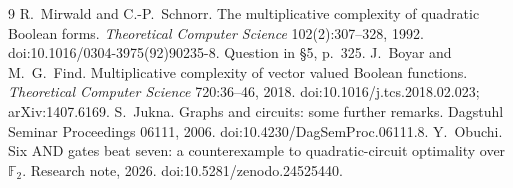 \begin{thebibliography}{9}
 R.~Mirwald and C.-P.~Schnorr. The multiplicative complexity of quadratic Boolean forms. \emph{Theoretical Computer Science} 102(2):307--328, 1992. doi:10.1016/0304-3975(92)90235-8. Question in \S5, p.~325.
 J.~Boyar and M.~G.~Find. Multiplicative complexity of vector valued Boolean functions. \emph{Theoretical Computer Science} 720:36--46, 2018. doi:10.1016/j.tcs.2018.02.023; arXiv:1407.6169.
 S.~Jukna. Graphs and circuits: some further remarks. Dagstuhl Seminar Proceedings 06111, 2006. doi:10.4230/DagSemProc.06111.8.
 Y.~Obuchi. Six AND gates beat seven: a counterexample to quadratic-circuit optimality over $\mathbb F_2$. Research note, 2026. doi:10.5281/zenodo.24525440.
\end{thebibliography}
